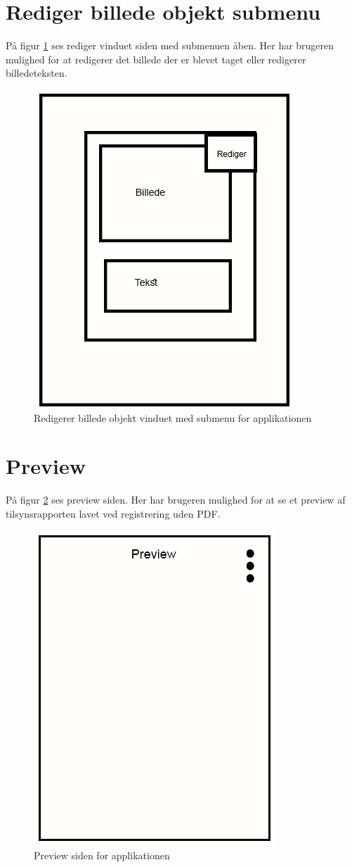 \section{Rediger billede objekt submenu}\label{sec:RedigerBilledeSubMock}
På figur \ref{fig:RedigerBilledeSubMock} ses rediger vinduet siden med submenuen åben. Her har brugeren mulighed for at redigerer det billede der er blevet taget eller redigerer billedeteksten.

\begin{figure}[H]
	\centering
	\includegraphics[width=0.4\linewidth]{MockUps/Mock/Ramboell-RedigerBilledeOpbjekt-Sub}
	\caption{Redigerer billede objekt vinduet med submenu for applikationen}
	\label{fig:RedigerBilledeSubMock}
\end{figure}

\clearpage

\section{Preview}\label{sec:PreviewMock}
På figur \ref{fig:PreviewMock} ses preview siden. Her har brugeren mulighed for at se et preview af tilsynsrapporten lavet ved registrering uden PDF.

\begin{figure}[H]
	\centering
	\includegraphics[width=0.4\linewidth]{MockUps/Mock/Ramboell-Preview}
	\caption{Preview siden for applikationen}
	\label{fig:PreviewMock}
\end{figure}

